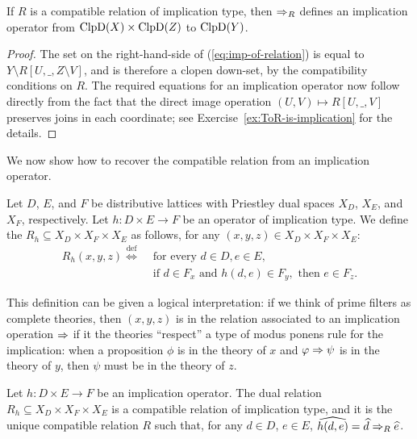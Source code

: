 \begin{lemma}\label{lem:ToR-is-implication}
  If $R$ is a compatible relation of implication type, then $\Rightarrow_R$ defines an implication operator from $\mathrm{ClpD}(X) \times \mathrm{ClpD}(Z)$ to $\mathrm{ClpD}(Y)$.
\end{lemma}
\begin{proof}
  The set on the right-hand-side of (\ref{eq:imp-of-relation}) is equal to $Y \setminus R[U, \_, Z \setminus V]$, and is therefore a clopen down-set, by the compatibility conditions on $R$. The required equations for an implication operator now follow directly from the fact that the direct image operation $(U, V) \mapsto R[U,\_,V]$ preserves joins in each coordinate; see Exercise~\ref{ex:ToR-is-implication} for the details.
\end{proof}
We now show how to recover the compatible relation from an implication operator.
\begin{definition} \label{dfn:dual-relation-of-implication} Let $D$, $E$, and $F$ be distributive lattices with Priestley
dual spaces $X_D$, $X_E$, and $X_F$, respectively.  Let $h \colon D \times E \to
F$ be an operator of implication type. We define the 
$R_h \subseteq X_D \times X_F \times X_E$ as follows, for any $(x, y, z) \in X_D
\times X_F \times X_E$: 
\begin{align}\label{eq:dual-ternary-rel} 
  R_h(x,y,z) \stackrel{\mathrm{def}}{\iff} &\text{ for every } d
\in D, e \in E, \\ 
&\text{ if } d \in F_x \text{ and } h(d, e) \in F_y, \text{ then } e \in F_z.\nonumber
\end{align} 
\end{definition}
This definition can be given a logical interpretation: if we think of prime filters as complete theories, then $(x,y,z)$ is in the relation associated to an implication operation $\Rightarrow$ if it the theories ``respect'' a type of modus ponens rule for the implication: when a proposition $\phi$ is in the theory of $x$ and $\varphi \Rightarrow \psi$ is in the theory of $y$, then $\psi$ must be in the theory of $z$.
\begin{proposition}\label{prop:implication-operator-objects}
  Let $h \colon D \times E \to F$ be an implication operator. The dual relation $R_h \subseteq X_D \times X_F \times X_E$ is a compatible relation of implication type, and it is the unique compatible relation $R$ such that, for any $d \in D$, $e \in E$, $\widehat{h(d,e)} = \widehat{d} \Rightarrow_R \widehat{e}$.
\end{proposition}
